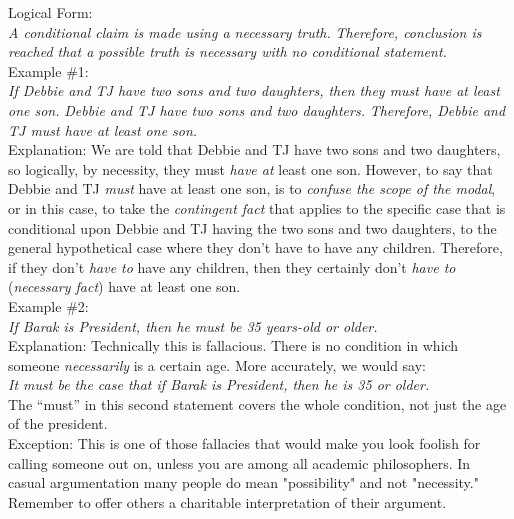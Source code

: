 \documentclass[a4paper,12pt,single,pdftex]{scrartcl}
\begin{document}
    
      Logical Form:
    \\

    
      {\em A conditional claim is made using a necessary truth.} \newline
{\em Therefore, conclusion is reached that a possible truth is necessary with no conditional statement.}
    \\

    
      Example \#1:
    \\

    
      {\em If Debbie and TJ have two sons and two daughters, then they must have at least one son.} \newline
{\em Debbie and TJ have two sons and two daughters.} \newline
{\em Therefore, Debbie and TJ must have at least one son.}
    \\

    
      Explanation: We are told that Debbie and TJ have two sons and two daughters, so logically, by necessity, they must {\it have at} least one son.  However, to say that Debbie and TJ {\it must} have at least one son, is to {\it confuse the scope of the modal}, or in this case, to take the {\it contingent fact} that applies to the specific case that is conditional upon Debbie and TJ having the two sons and two daughters, to the general hypothetical case where they don’t have to have any children.  Therefore, if they don’t {\it have to} have any children, then they certainly don’t {\it have to} ({\it necessary fact}) have at least one son.
    \\

    
      Example \#2:
    \\

    
      {\em If Barak is President, then he must be 35 years-old or older.}
    \\

    
      Explanation: Technically this is fallacious.  There is no condition in which someone {\it necessarily} is a certain age.  More accurately, we would say:
    \\

    
      {\em It must be the case that if Barak is President, then he is 35 or older.}
    \\

    
      The “must” in this second statement covers the whole condition, not just the age of the president.
    \\

    
      Exception: This is one of those fallacies that would make you look foolish for calling someone out on, unless you are among all academic philosophers. In casual argumentation many people do mean "possibility" and not "necessity." Remember to offer others a charitable interpretation of their argument.
    \\
\end{document}
